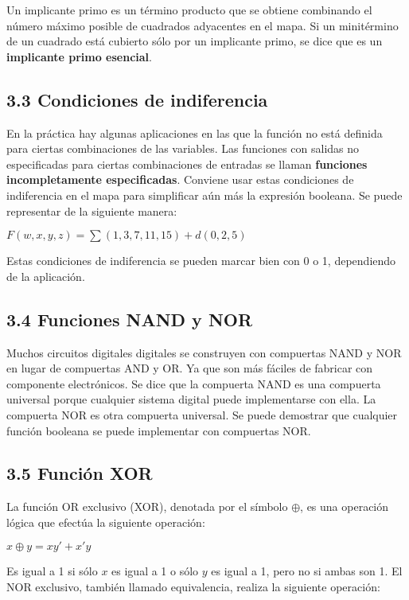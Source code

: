 \documentclass{article}
\begin{document}
Un implicante primo es un t\'{e}rmino producto que se obtiene combinando el n\'{u}mero m\'{a}ximo posible de cuadrados
adyacentes en el mapa. Si un minit\'{e}rmino de un cuadrado est\'{a} cubierto s\'{o}lo por un implicante primo, se dice que
es un \textbf{implicante primo esencial}.

\subsection*{3.3 Condiciones de indiferencia}
En la pr\'{a}ctica hay algunas aplicaciones en las que la funci\'{o}n no est\'{a} definida para ciertas combinaciones de las
variables. Las funciones con salidas no especificadas para ciertas combinaciones de entradas se llaman \textbf{funciones
incompletamente especificadas}. Conviene usar estas condiciones de indiferencia en el mapa para simplificar a\'{u}n m\'{a}s
la expresi\'{o}n booleana. Se puede representar de la siguiente manera:
\begin{center}
    $F(w, x, y, z) = \sum (1, 3, 7, 11, 15) + d(0, 2, 5)$
\end{center}
Estas condiciones de indiferencia se pueden marcar bien con 0 o 1, dependiendo de la aplicaci\'{o}n.

\subsection*{3.4 Funciones NAND y NOR}
Muchos circuitos digitales digitales se construyen con compuertas NAND y NOR en lugar de compuertas AND y OR.
Ya que son m\'{a}s f\'{a}ciles de fabricar con componente electr\'{o}nicos.
Se dice que la compuerta NAND es una compuerta universal porque cualquier sistema digital puede implementarse con ella.
La compuerta NOR es otra compuerta universal. Se puede demostrar que cualquier funci\'{o}n booleana se puede implementar
con compuertas NOR.

\subsection*{3.5 Funci\'{o}n XOR}
La funci\'{o}n OR exclusivo (XOR), denotada por el s\'{i}mbolo $\oplus$, es una operaci\'{o}n l\'{o}gica que efect\'{u}a
la siguiente operaci\'{o}n:
\begin{center}
    $x \oplus y = xy' + x'y$
\end{center}
Es igual a 1 si s\'{o}lo $x$ es igual a 1 o s\'{o}lo $y$ es igual a 1, pero no si ambas son 1. El NOR exclusivo, tambi\'{e}n
llamado equivalencia, realiza la siguiente operaci\'{o}n:
\end{document}
